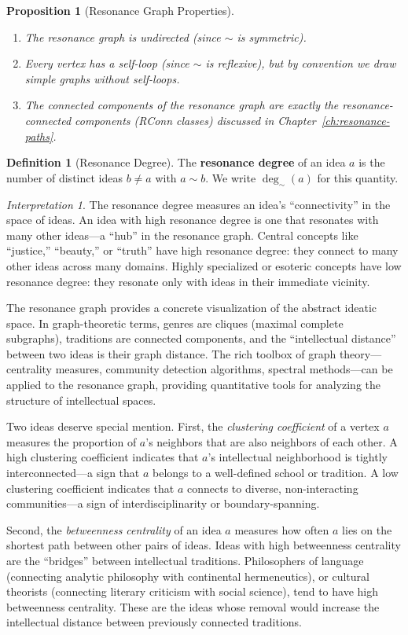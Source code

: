 \documentclass[11pt,openany]{book}
\theoremstyle{definition}
\newtheorem{definition}[axiom]{Definition}
\theoremstyle{plain}
\newtheorem{proposition}[axiom]{Proposition}
\theoremstyle{remark}
\newtheorem{interpretation}[axiom]{Interpretation}
\newcommand{\res}{\sim}                      %
\begin{document}
\begin{proposition}[Resonance Graph Properties]
\begin{enumerate}
\item The resonance graph is undirected (since $\res$ is symmetric).
\item Every vertex has a self-loop (since $\res$ is reflexive), but by convention we draw simple graphs without self-loops.
\item The connected components of the resonance graph are exactly the resonance-connected components (RConn classes) discussed in Chapter~\ref{ch:resonance-paths}.
\end{enumerate}
\end{proposition}

\begin{definition}[Resonance Degree]
The \textbf{resonance degree} of an idea $a$ is the number of distinct ideas $b \neq a$ with $a \res b$. We write $\deg_\res(a)$ for this quantity.
\end{definition}

\begin{interpretation}
The resonance degree measures an idea's ``connectivity'' in the space of ideas. An idea with high resonance degree is one that resonates with many other ideas---a ``hub'' in the resonance graph. Central concepts like ``justice,'' ``beauty,'' or ``truth'' have high resonance degree: they connect to many other ideas across many domains. Highly specialized or esoteric concepts have low resonance degree: they resonate only with ideas in their immediate vicinity.

The resonance graph provides a concrete visualization of the abstract ideatic space. In graph-theoretic terms, genres are cliques (maximal complete subgraphs), traditions are connected components, and the ``intellectual distance'' between two ideas is their graph distance. The rich toolbox of graph theory---centrality measures, community detection algorithms, spectral methods---can be applied to the resonance graph, providing quantitative tools for analyzing the structure of intellectual spaces.

Two ideas deserve special mention. First, the \emph{clustering coefficient} of a vertex $a$ measures the proportion of $a$'s neighbors that are also neighbors of each other. A high clustering coefficient indicates that $a$'s intellectual neighborhood is tightly interconnected---a sign that $a$ belongs to a well-defined school or tradition. A low clustering coefficient indicates that $a$ connects to diverse, non-interacting communities---a sign of interdisciplinarity or boundary-spanning.

Second, the \emph{betweenness centrality} of an idea $a$ measures how often $a$ lies on the shortest path between other pairs of ideas. Ideas with high betweenness centrality are the ``bridges'' between intellectual traditions. Philosophers of language (connecting analytic philosophy with continental hermeneutics), or cultural theorists (connecting literary criticism with social science), tend to have high betweenness centrality. These are the ideas whose removal would increase the intellectual distance between previously connected traditions.
\end{interpretation}
\end{document}
